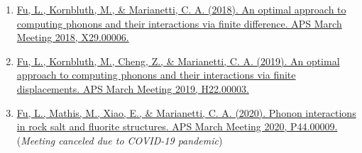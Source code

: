 \documentclass[
  a4paper,
  12pt
]{cv}
\begin{document}
\begin{enumerate}
\item
\href{https://meetings.aps.org/Meeting/MAR18/Event/322388}{
Fu, L., Kornbluth, M., \& Marianetti, C. A. (2018).
An optimal approach to computing phonons and their interactions via finite difference.
APS March Meeting 2018, X29.00006.
}
%
\item
\href{https://meetings.aps.org/Meeting/MAR19/Session/H22.3}{
Fu, L., Kornbluth, M., Cheng, Z., \& Marianetti, C. A. (2019).
An optimal approach to computing phonons and their interactions via finite displacements.
APS March Meeting 2019, H22.00003.
}
%
\item
\href{https://meetings.aps.org/Meeting/MAR20/Session/P44.9}{
Fu, L., Mathis, M., Xiao, E., \& Marianetti, C. A. (2020).
Phonon interactions in rock salt and fluorite structures.
APS March Meeting 2020, P44.00009.
} (\emph{Meeting canceled due to COVID-19 pandemic})
\end{enumerate}
\end{document}
